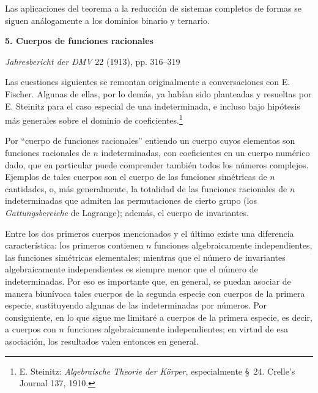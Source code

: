\documentclass[11pt]{article}
\begin{document}
Las aplicaciones del teorema a la reducción de sistemas completos de formas se siguen análogamente a los dominios binario y ternario.

\clearpage
\providecommand{\Kfield}{\mathfrak{K}}
\providecommand{\Ssys}{\mathfrak{S}}
\providecommand{\Mfield}{\mathfrak{M}}
\providecommand{\tq}{\tau}
\providecommand{\Lsys}{\mathfrak{L}}
\providecommand{\Jdom}{\mathfrak{J}}
\providecommand{\ds}{\displaystyle}

\begin{center}
{\Large\bfseries 5. Cuerpos de funciones racionales}\par
\vspace{1.2em}
\emph{Jahresbericht der DMV} 22 (1913), pp. 316--319
\end{center}

\vspace{1.5em}

Las cuestiones siguientes se remontan originalmente a conversaciones con E. Fischer. Algunas de ellas, por lo demás, ya habían sido planteadas y resueltas por E. Steinitz para el caso especial de una indeterminada, e incluso bajo hipótesis más generales sobre el dominio de coeficientes.\footnote{E. Steinitz: \emph{Algebraische Theorie der Körper}, especialmente \S\ 24. Crelle's Journal 137, 1910.}

Por ``cuerpo de funciones racionales'' entiendo un cuerpo cuyos elementos son funciones racionales de $n$ indeterminadas, con coeficientes en un cuerpo numérico dado, que en particular puede comprender también todos los números complejos. Ejemplos de tales cuerpos son el cuerpo de las funciones simétricas de $n$ cantidades, o, más generalmente, la totalidad de las funciones racionales de $n$ indeterminadas que admiten las permutaciones de cierto grupo (los \emph{Gattungsbereiche} de Lagrange); además, el cuerpo de invariantes.

Entre los dos primeros cuerpos mencionados y el último existe una diferencia característica: los primeros contienen $n$ funciones algebraicamente independientes, las funciones simétricas elementales; mientras que el número de invariantes algebraicamente independientes es siempre menor que el número de indeterminadas. Por eso es importante que, en general, se puedan asociar de manera biunívoca tales cuerpos de la segunda especie con cuerpos de la primera especie, sustituyendo algunas de las indeterminadas por números. Por consiguiente, en lo que sigue me limitaré a cuerpos de la primera especie, es decir, a cuerpos con $n$ funciones algebraicamente independientes; en virtud de esa asociación, los resultados valen entonces en general.
\end{document}
